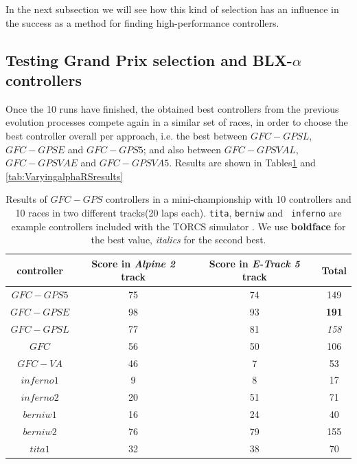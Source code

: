 \documentclass[10pt,journal,compsoc]{IEEEtran}
\begin{document}
 In the next subsection we
will see how this kind of selection has an influence in the success as
a method for finding high-performance controllers.


\subsection{Testing Grand Prix selection and BLX-$\alpha$ controllers}


Once the 10 runs have finished, the obtained best controllers from the
previous evolution processes compete again in a similar set of races,
in order to choose the best controller overall per approach, i.e. the
best between $GFC-GPSL$, $GFC-GPSE$ and $GFC-GPS5$; and also between
$GFC-GPSVAL$,$GFC-GPSVAE$ and $GFC-GPSVA5$. 
Results are shown in Tables\ref{tab:RSresults} and \ref{tab:VaryingalphaRSresults}

\begin{table}[ht]
	\centering
	{\scriptsize
		\caption{ Results of $GFC-GPS$ controllers in a mini-championship with 10 controllers and 10
			races in two different tracks(20 laps each). {\tt tita}, {\tt berniw} and {\tt
				inferno} are example controllers included with the TORCS
			simulator \cite{torcs4}. We use {\bf boldface}
                      for the best value, {\em italics} for the second
                    best. }
		{
			\begin{tabular}{|c|c|c||c|}
				\hline
				controller&Score in \textit{Alpine 2} track &Score in \textit{E-Track 5} track &Total\\
				\hline
				\hline
				
			$GFC-GPS5$\cite{DBLP:conf/cig/SalemMG19}&	75	&74&	149\\
			$GFC-GPSE$&	98	&93&	{\bf 191}\\
			$GFC-GPSL$\cite{DBLP:conf/cig/SalemMG19}&	77	&81&	{\em 158}\\
			$GFC$ \cite{salem_cig2018}	&	56	&50&	106\\
			$GFC-VA$\cite{DBLP:conf/cig/SalemMG19}	&	46	&7&		53\\
			$inferno1$&	9	&8&		17\\
			$inferno2$&		20	&51&	71\\
			$berniw1$&	16	&24&	40\\
			$berniw2$&	76	&79&	155\\
			$tita1$&32	&38&	70\\		
				\hline
				
			\end{tabular}
		}\label{tab:RSresults}
	}
\end{table}
%
\end{document}
